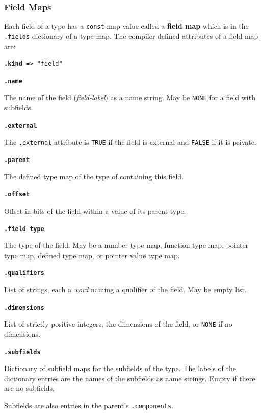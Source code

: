 \documentclass[12pt]{article}
\newcommand{\key}[1]{{\rm \bfseries #1}}
\newcommand{\ttkey}[1]{{\tt \bfseries #1}}
\newenvironment{indpar}[1][0.3in]%
	{\begin{list}{}%
		     {\setlength{\itemsep}{0in}%
		      \setlength{\topsep}{0in}%
		      \setlength{\parsep}{1ex}%
		      \setlength{\labelwidth}{#1}%
		      \setlength{\leftmargin}{#1}%
		      \addtolength{\leftmargin}{\labelsep}}%
	 \item}%
	{\end{list}}
\begin{document}
\subsubsection{Field Maps}
\label{FIELD-MAPS}

Each field of a type has a {\tt const} map value called
a \key{field map} which is in the {\tt .fields} dictionary of
a type map.  The compiler defined attributes of a field map are:

{\tt \ttkey{.kind} => "field"}

\ttkey{.name}
\begin{indpar}
The name of the field ({\em field-label})
as a name string.  May be {\tt NONE} for a field with subfields.
\end{indpar}

\ttkey{.external}
\begin{indpar}
The {\tt .external} attribute is {\tt TRUE} if the field
is external and {\tt FALSE} if it is private.
\end{indpar}

\ttkey{.parent}
\begin{indpar}
The defined type map of the type of containing this field.
\end{indpar}

\ttkey{.offset}
\begin{indpar}
Offset in bits of the field within a value of its parent type.
\end{indpar}

\ttkey{.field type}
\begin{indpar}
The type of the field.  May be a number type map, function type map,
pointer type map, defined type map, or pointer value type map.
\end{indpar}

\ttkey{.qualifiers}
\begin{indpar}
List of strings, each a {\em word} naming a qualifier
of the field.  May be empty list.
\end{indpar}

\ttkey{.dimensions}
\begin{indpar}
List of strictly positive integers, the dimensions of the field, or {\tt NONE}
if no dimensions.
\end{indpar}

\ttkey{.subfields}
\begin{indpar}
Dictionary of subfield maps for the subfields of the type.  The labels
of the dictionary entries are the names of the subfields as name strings.
Empty if there are no subfields.

Subfields are also entries in the parent's {\tt .components}.
\end{indpar}
\end{document}
